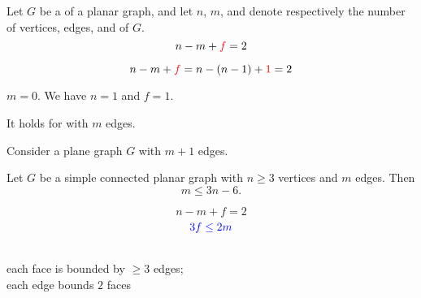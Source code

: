 \begin{frame}{}
  \begin{theorem}
    Let $G$ be a  of a  planar graph,
    and let $n$, $m$, and  denote respectively the number of vertices,
    edges, and  of $G$.
    \[
      n - m + \textcolor{red}{f} = 2
    \]
  \end{theorem}

  \pause
  \vspace{0.30cm}

  \pause
  \[
    n - m + \textcolor{red}{f} = n - (n - 1) + \textcolor{red}{1} = 2
  \]
\end{frame}

\begin{frame}{}
  \begin{center}

    \pause
    \vspace{0.30cm}
    \begin{description}
      \setlength{\itemsep}{8pt}
      \item[Basis Step:] $m = 0$. We have $n = 1$ and $f = 1$.
      \item[Induction Hypothesis:]
        It holds for  with $m$ edges.
      \item[Induction Step:] Consider a plane graph $G$ with $m+1$ edges. \\[5pt]
    \end{description}
  \end{center}
\end{frame}

\begin{frame}{}
  \begin{theorem}
    Let $G$ be a simple connected planar graph with $n \ge 3$ vertices
    and $m$ edges. Then
    \[
      m \le 3n -6.
    \]
  \end{theorem}

  \pause
  \[
    n - m + f = 2
  \]
  \pause
  \[
    \textcolor{blue}{3f \le 2m}
  \]
  \pause
  \begin{center}
     \\[3pt]
    each face is bounded by $\ge 3$ edges; \\
    each edge bounds $2$ faces
  \end{center}
\end{frame}

